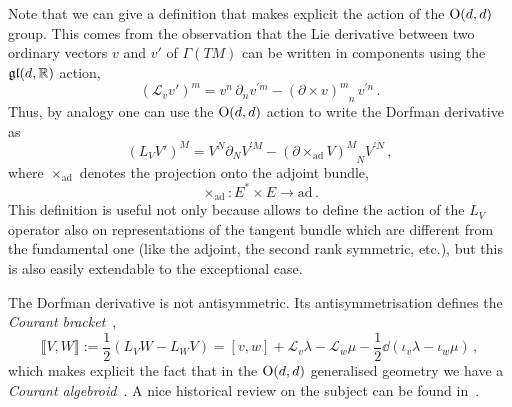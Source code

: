 \documentclass[debug]{phd}
\begin{document}
					Note that we can give a definition that makes explicit the action of the $\mathrm{O}(d,d)$ group.
					This comes from the observation that the Lie derivative between two ordinary vectors $v$ and $v'$ of $\Gamma(TM)$ can be written in components using the $\mathfrak{gl}(d, \mathbb{R})$ action,
							\begin{equation*}
								( \mathcal{L}_v v')^m = v^n \,\partial_n v^{\prime m} - (\partial \times v)^m_{\phantom{m}n} \,v^{\prime n} \, .
							\end{equation*}
					Thus, by analogy one can use the $\mathrm{O}(d,d)$ action to write the Dorfman derivative as
							\begin{equation}\label{adjDorf}
								\left(L_V V'\right)^M = V^N \partial_N V^{\prime M} - \left(\partial \times_{\mathrm{ad}} V \right)^M_{\phantom{M}N}V^{\prime N} \, ,
							\end{equation}
					where $\times_{\mathrm{ad}}$ denotes the projection onto the adjoint bundle,
							\begin{equation}
								\times_{\mathrm{ad}} : E^* \times E \longrightarrow \mathrm{ad} \, .
							\end{equation}
					This definition is useful not only because allows to define the action of the $L_V$ operator also on representations of the tangent bundle which are different from the fundamental one (like the adjoint, the second rank symmetric, etc.), but this is also easily extendable to the exceptional case.
					
					The Dorfman derivative is not antisymmetric.
					Its antisymmetrisation defines the \emph{Courant bracket}~\cite{CourWein, waldram1},
							\begin{equation}\label{cour}
								\llbracket V, W \rrbracket := \frac{1}{2}\left( L_V W - L_W V \right) = \left[v, w\right] + \mathcal{L}_v \lambda - \mathcal{L}_w \mu - \frac{1}{2} \dd (\iota_v \lambda - \iota_w \mu) \, ,
							\end{equation}
					which makes explicit the fact that in the $\mathrm{O}(d,d)$ generalised geometry we have a \emph{Courant algebroid}~\cite{CourWein, courant}.
					A nice historical review on the subject can be found in~\cite{courhist}.
					
\end{document}

